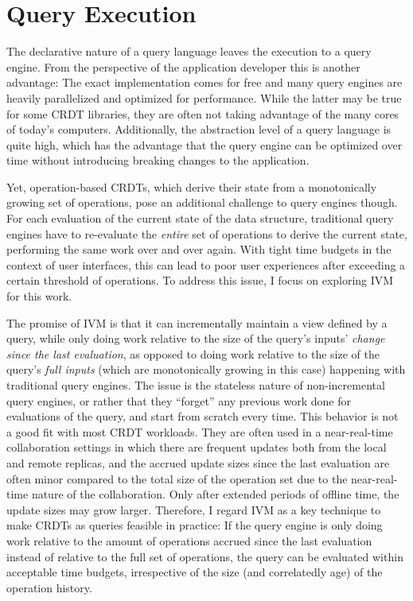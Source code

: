\section{Query Execution}

The declarative nature of a query language leaves the execution to a query engine.
From the perspective of the application developer this is another advantage:
The exact implementation comes for free and many query engines are heavily
parallelized and optimized for performance. While the latter may be true
for some \ac{CRDT} libraries, they are often not taking advantage of the many
cores of today's computers.
Additionally, the abstraction level of a query language is quite high,
which has the advantage that the query engine can be optimized over time without
introducing breaking changes to the application.

Yet, operation-based \acp{CRDT}, which derive their state from a monotonically
growing set of operations, pose an additional challenge to query engines though.
For each evaluation of the current state of the data structure,
traditional query engines have to re-evaluate the \emph{entire}
set of operations to derive the current state, performing the same work over
and over again.
With tight time budgets in the context of user interfaces, this can lead to
poor user experiences after exceeding a certain threshold of operations.
To address this issue, I focus on exploring \ac{IVM} for this work.

The promise of \ac{IVM} is that it can incrementally maintain a view defined
by a query, while only doing work relative to the size of the query's
inputs' \emph{change since the last evaluation}, as opposed to doing work
relative to the size of the query's \emph{full inputs} (which are monotonically
growing in this case) happening with traditional query engines.
The issue is the stateless nature of non-incremental query engines, or rather
that they ``forget'' any previous work done for evaluations of the query,
and start from scratch every time.
This behavior is not a good fit with most \ac{CRDT} workloads.
They are often used in a near-real-time collaboration settings in which there
are frequent updates both from the local and remote replicas, and the accrued
update sizes since the last evaluation are often minor compared to the total
size of the operation set due to the near-real-time nature of the collaboration.
Only after extended periods of offline time, the update sizes may grow larger.
Therefore, I regard \ac{IVM} as a key technique to make \acp{CRDT} as queries
feasible in practice:
If the query engine is only doing work relative to the amount of operations
accrued since the last evaluation instead of relative to the full set of
operations, the query can be evaluated within acceptable time budgets,
irrespective of the size (and correlatedly age) of the operation history.

